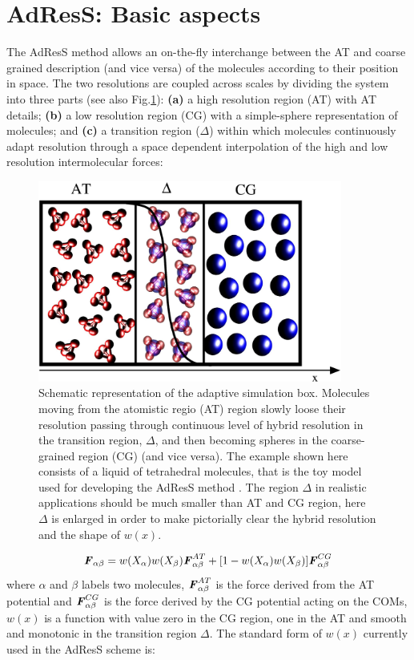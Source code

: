 \documentclass[aps,pre,preprint]{revtex4}
\renewcommand{\v}[1]{\textbf{\textit{#1}}}
\begin{document}
\section{AdResS: Basic aspects}
The  AdResS method allows an on-the-fly interchange between the AT and coarse grained description (and vice versa) of the molecules according to their position in space. 
The two resolutions are coupled across scales by dividing the system into three parts (see also Fig.\ref{adapt}): {\bf (a)}
a high resolution region (AT) with AT details; {\bf (b)} a low resolution region (CG) with a simple-sphere
representation of molecules; and {\bf (c)} a transition region ($\Delta$) within which molecules continuously
adapt resolution through a space dependent interpolation of the high and low resolution intermolecular
forces:
\begin{figure}
  \centering
  \includegraphics[angle=0,width=10cm]{adapt-pic.eps}
  \caption{Schematic representation of the adaptive simulation box. Molecules moving from the atomistic regio (AT) region slowly loose their resolution passing through continuous level of hybrid resolution in the transition region, $\Delta$, and then becoming spheres in the coarse-grained region (CG) (and vice versa). The example shown here consists of a liquid of tetrahedral molecules, that is the toy model used for developing the AdResS method \cite{jcp}. The region $\Delta$ in realistic applications should be much smaller than AT and CG region, here $\Delta$ is enlarged in order to make pictorially clear the hybrid resolution and the shape of $w(x)$.}
  \label{adapt}
\end{figure} 
\begin{equation}
{\v F}_{\alpha \beta}=w(X_\alpha)w(X_\beta){\v F}_{\alpha\beta}^{AT}+[1-w(X_\alpha)w(X_\beta)]{\v F}^{CG}_{\alpha\beta}
\label{force}
\end{equation}
where $\alpha$ and $\beta$ labels two molecules, ${\v F}_{\alpha\beta}^{AT}$ is the force derived from the AT potential and ${\v F}^{CG}_{\alpha\beta}$ is the force derived by the CG potential acting on the COMs, $w(x)$ is a function with value zero in the CG region, one in the AT and smooth and monotonic in the transition region $\Delta$. The standard form of $w(x)$ currently used in the AdResS scheme is:
\end{document}
